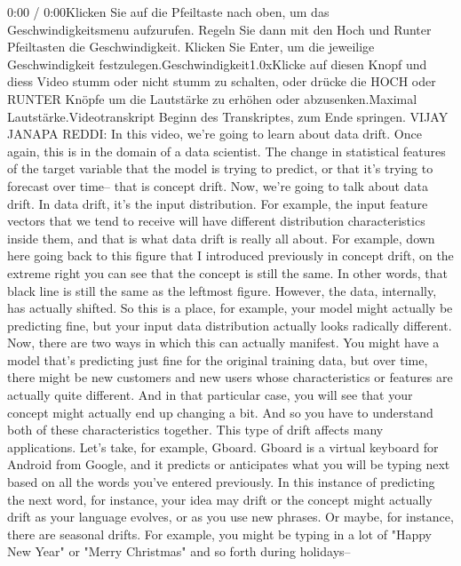 {{{{{{{{    0:00 / 0:00Klicken Sie auf die Pfeiltaste nach oben, um das Geschwindigkeitsmenu aufzurufen. Regeln Sie dann mit den Hoch und Runter Pfeiltasten die Geschwindigkeit. Klicken Sie Enter, um die jeweilige Geschwindigkeit festzulegen.Geschwindigkeit1.0xKlicke auf diesen Knopf und diess Video stumm oder nicht stumm zu schalten, oder drücke die HOCH oder RUNTER Knöpfe um die Lautstärke zu erhöhen oder abzusenken.Maximal Lautstärke.Videotranskript
    Beginn des Transkriptes, zum Ende springen.
    VIJAY JANAPA REDDI: In this video, we're going to learn about data drift.
    Once again, this is in the domain of a data scientist.
    The change in statistical features of the target
    variable that the model is trying to predict,
    or that it's trying to forecast over time-- that is concept drift.
    Now, we're going to talk about data drift.
    In data drift, it's the input distribution.
    For example, the input feature vectors that we
    tend to receive will have different distribution
    characteristics inside them, and that is what data drift is really all about.
    For example, down here going back to this figure
    that I introduced previously in concept drift, on the extreme right
    you can see that the concept is still the same.
    In other words, that black line is still the same as the leftmost figure.
    However, the data, internally, has actually shifted.
    So this is a place, for example, your model
    might actually be predicting fine, but your input data distribution actually
    looks radically different.
    Now, there are two ways in which this can actually manifest.
    You might have a model that's predicting just fine for the original training
    data, but over time, there might be new customers
    and new users whose characteristics or features are actually quite different.
    And in that particular case, you will see that your concept might actually
    end up changing a bit.
    And so you have to understand both of these characteristics together.
    This type of drift affects many applications.
    Let's take, for example, Gboard.
    Gboard is a virtual keyboard for Android from Google,
    and it predicts or anticipates what you will
    be typing next based on all the words you've entered previously.
    In this instance of predicting the next word, for instance, your idea may drift
    or the concept might actually drift as your language evolves,
    or as you use new phrases.
    Or maybe, for instance, there are seasonal drifts.
    For example, you might be typing in a lot of "Happy New Year" or "Merry
    Christmas" and so forth during holidays--
}}}}}}}}
